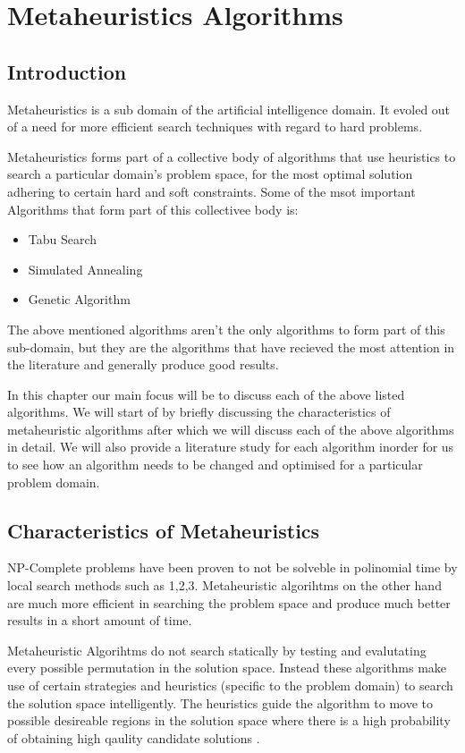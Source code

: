 \chapter{Metaheuristics Algorithms}

\section{Introduction}
Metaheuristics is a sub domain of the artificial intelligence domain. It evoled out of a need for more efficient search techniques with regard to hard problems. 

Metaheuristics forms part of a collective body of algorithms that use heuristics to search a particular domain's problem space, for the most optimal solution adhering to certain hard and soft constraints. Some of the msot important Algorithms that form part of this collectivee body is:
\begin{itemize}
\item Tabu Search
\item Simulated Annealing
\item Genetic Algorithm
\end{itemize}
The above mentioned algorithms aren't the only algorithms to form part of this sub-domain, but they are the algorithms that have recieved the most attention in the literature and generally produce good results.

In this chapter our main focus will be to discuss each of the above listed algorithms. We will start of by briefly discussing the characteristics of metaheuristic algorithms after which we will discuss each of the above algorithms in detail. We will also provide a literature study for each algorithm inorder for us to see how an algorithm needs to be changed and optimised for a particular problem domain. 

\section{Characteristics of Metaheuristics}
NP-Complete problems have been proven to not be solveble in polinomial time by local search methods such as 1,2,3. Metaheuristic algorihtms on the other hand are much more efficient in searching the problem space and produce much better results in a short amount of time. 

Metaheuristic Algorihtms do not search statically by testing and evalutating every possible permutation in the solution space. Instead these algorithms make use of certain strategies and heuristics (specific to the problem domain) to search the solution space intelligently. The heuristics guide the algorithm to move to possible desireable regions in the solution space where there is a high probability of obtaining high qaulity candidate solutions \cite{HeuristicManipulation}.

